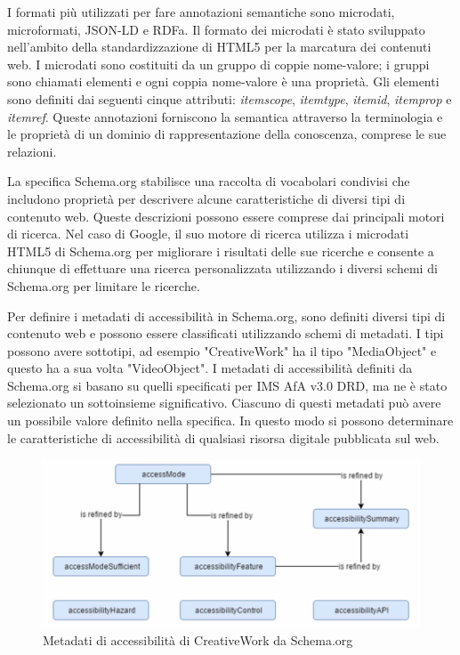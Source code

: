 I formati più utilizzati per fare annotazioni semantiche sono microdati, microformati, JSON-LD e RDFa.
Il formato dei microdati è stato sviluppato nell'ambito della standardizzazione di HTML5 per la marcatura dei contenuti web. I microdati sono costituiti da un gruppo di coppie nome-valore; i gruppi sono chiamati elementi e ogni coppia nome-valore è una proprietà. Gli elementi sono definiti dai seguenti cinque attributi: \textit{itemscope}, \textit{itemtype}, \textit{itemid}, \textit{itemprop} e \textit{itemref}. Queste annotazioni forniscono la semantica attraverso la terminologia e le proprietà di un dominio di rappresentazione della conoscenza, comprese le sue relazioni.

La specifica Schema.org stabilisce una raccolta di vocabolari condivisi che includono proprietà per descrivere alcune caratteristiche di diversi tipi di contenuto web. Queste descrizioni possono essere comprese dai principali motori di ricerca. Nel caso di Google, il suo motore di ricerca utilizza i microdati HTML5 di Schema.org per migliorare i risultati delle sue ricerche e consente a chiunque di effettuare una ricerca personalizzata utilizzando i diversi schemi di Schema.org per limitare le ricerche.

Per definire i metadati di accessibilità in Schema.org, sono definiti diversi tipi di contenuto web e possono essere
classificati utilizzando schemi di metadati.
I tipi possono avere sottotipi, ad esempio "CreativeWork" ha il tipo "MediaObject" e questo ha a sua volta "VideoObject".
I metadati di accessibilità definiti da Schema.org si basano su quelli specificati per IMS AfA v3.0 DRD, ma ne è stato selezionato un sottoinsieme significativo. Ciascuno di questi metadati può avere un possibile valore definito nella specifica. In questo modo si possono determinare le caratteristiche di accessibilità di qualsiasi risorsa digitale pubblicata sul web.

\begin{figure}[H]
\centering
\includegraphics[scale=0.7]{res/schemaorg.png}
\caption{Metadati di accessibilità di CreativeWork da Schema.org}
\label{fig:schemaorg}
\end{figure}